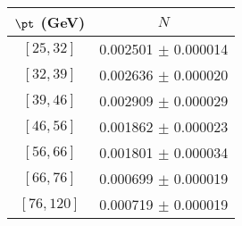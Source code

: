 \begin{tabular}{c||c}
$\pt$ (GeV) & $N$  \\
\hline
$[25, 32]$ & 0.002501 $\pm$ 0.000014\\
$[32, 39]$ & 0.002636 $\pm$ 0.000020\\
$[39, 46]$ & 0.002909 $\pm$ 0.000029\\
$[46, 56]$ & 0.001862 $\pm$ 0.000023\\
$[56, 66]$ & 0.001801 $\pm$ 0.000034\\
$[66, 76]$ & 0.000699 $\pm$ 0.000019\\
$[76, 120]$ & 0.000719 $\pm$ 0.000019\\
\end{tabular}
